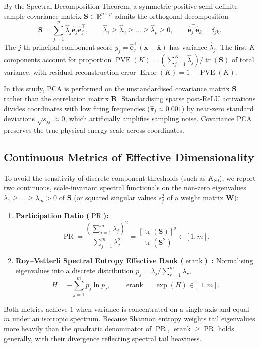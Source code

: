 \documentclass[12pt, a4paper, oneside]{report}
\theoremstyle{definition}
\newcommand{\vect}[1]{\mathbf{#1}}
\newcommand{\mat}[1]{\mathbf{#1}}
\newcommand{\tr}{\operatorname{tr}}
\newcommand{\erank}{\operatorname{erank}}
\newcommand{\PR}{\operatorname{PR}}
\newcommand{\R}{\mathbb{R}}
\begin{document}
By the Spectral Decomposition Theorem, a symmetric positive semi-definite sample covariance matrix $\mat{S} \in \R^{p \times p}$ admits the orthogonal decomposition
\begin{equation}
    \mat{S} = \sum_{j=1}^{p} \hat{\lambda}_j \hat{\vect{e}}_j \hat{\vect{e}}_j^\top,
    \qquad \hat{\lambda}_1 \ge \hat{\lambda}_2 \ge \dots \ge \hat{\lambda}_p \ge 0,
    \qquad \hat{\vect{e}}_j^\top \hat{\vect{e}}_k = \delta_{jk}.
    \label{eq:spectral_decomp}
\end{equation}
The $j$-th principal component score $y_j = \hat{\vect{e}}_j^\top (\vect{x} - \bar{\vect{x}})$ has variance $\hat{\lambda}_j$. The first $K$ components account for proportion $\operatorname{PVE}(K) = (\sum_{j=1}^K \hat{\lambda}_j)/\tr(\mat{S})$ of total variance, with residual reconstruction error $\operatorname{Error}(K) = 1 - \operatorname{PVE}(K)$.

In this study, PCA is performed on the unstandardised covariance matrix $\mat{S}$ rather than the correlation matrix $\mat{R}$. Standardising sparse post-ReLU activations divides coordinates with low firing frequencies ($\hat{\pi}_j \approx 0.001$) by near-zero standard deviations $\sqrt{s_{jj}} \approx 0$, which artificially amplifies sampling noise. Covariance PCA preserves the true physical energy scale across coordinates.

\subsection{Continuous Metrics of Effective Dimensionality}

To avoid the sensitivity of discrete component thresholds (such as $K_{80}$), we report two continuous, scale-invariant spectral functionals on the non-zero eigenvalues $\lambda_1 \ge \dots \ge \lambda_m > 0$ of $\mat{S}$ (or squared singular values $s_j^2$ of a weight matrix $\mat{W}$):
\begin{enumerate}
    \item \textbf{Participation Ratio ($\PR$):}
    \begin{equation}
        \PR = \frac{\left(\sum_{j=1}^{m} \lambda_j\right)^2}{\sum_{j=1}^{m} \lambda_j^2} = \frac{[\tr(\mat{S})]^2}{\tr(\mat{S}^2)} \in [1, m].
        \label{eq:pr_def}
    \end{equation}
    \item \textbf{Roy--Vetterli Spectral Entropy Effective Rank ($\erank$)~\cite{roy2007effective}:} Normalising eigenvalues into a discrete distribution $p_j = \lambda_j / \sum_{r=1}^m \lambda_r$,
    \begin{equation}
        H = -\sum_{j=1}^{m} p_j \ln p_j,
        \qquad
        \erank = \exp(H) \in [1, m].
        \label{eq:erank_def}
    \end{equation}
\end{enumerate}
Both metrics achieve $1$ when variance is concentrated on a single axis and equal $m$ under an isotropic spectrum. Because Shannon entropy weights tail eigenvalues more heavily than the quadratic denominator of $\PR$, $\erank \ge \PR$ holds generally, with their divergence reflecting spectral tail heaviness.
\end{document}
